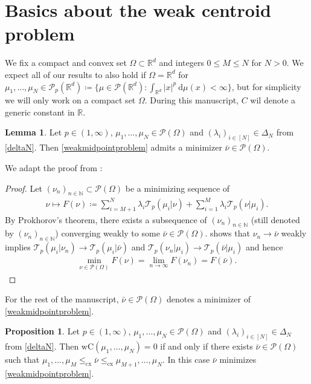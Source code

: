 \documentclass[letterpaper]{amsart}
\newcommand{\RR}{\mathbb{R}}
\newcommand{\NN}{\mathbb{N}}
\newcommand{\dd}{\mathrm{d}}
\theoremstyle{definition}
\newtheorem{lma}[thm]{Lemma}
\newtheorem{prop}[thm]{Proposition}
\begin{document}
\section{Basics about the weak centroid problem}
We fix a compact and convex set $\Omega\subset\RR^d$ and integers $0\leq M\leq N$ for $N>0$. We expect all of our results to also hold if $\Omega=\RR^d$ for $\mu_1,\dots,\mu_N\in\mathcal P_p(\RR^d)\coloneqq\big\{\mu\in\mathcal P(\RR^d):\int_{\RR^d}|x|^p\ \dd\mu(x)<\infty\}$, but for simplicity we will only work on a compact set $\Omega$. During this manuscript, $C$ wil denote a generic constant in $\RR$.
\begin{lma}
	Let $p\in (1,\infty)$,  $\mu_1,\dots,\mu_N\in\mathcal P(\Omega)$ and $(\lambda_i)_{i\in[N]}\in\Delta_N$ from \eqref{deltaN}. Then \eqref{weakmidpointproblem} admits a minimizer $\bar\nu\in\mathcal P(\Omega)$.
\end{lma}
We adapt the proof from \cite[Prop 1]{cazelles2021}:
\begin{proof}
	Let $(\nu_n)_{n\in\NN}\subset\mathcal P(\Omega)$ be a minimizing sequence of 
	\begin{gather*}
		\nu\mapsto F(\nu)\coloneqq \sum_{i=M+1}^N\mathcal \lambda_i \mathcal T_p(\mu_i|\nu)+\sum_{i=1}^M\lambda_i\mathcal T_p(\nu|\mu_i).
	\end{gather*}
	By Prokhorov's theorem, there exists a subsequence of $(\nu_n)_{n\in\NN}$ (still denoted by $(\nu_n)_{n\in\NN}$) converging weakly to some $\bar\nu\in\mathcal P(\Omega)$. \cite[Thm 1.5]{backhoff2020} shows that $\nu_n\rightarrow\bar\nu$ weakly implies $\mathcal T_p(\mu_i|\nu_n)\rightarrow\mathcal T_p(\mu_i|\bar\nu)$ and $\mathcal T_p(\nu_n|\mu_i)\rightarrow\mathcal T_p(\bar\nu|\mu_i)$ and hence
	\begin{gather*}
		\min_{\nu\in\mathcal P(\Omega)}F(\nu)=\lim_{n\rightarrow\infty}F(\nu_n)=F(\bar\nu).
	\end{gather*}
\end{proof}
For the rest of the manuscript, $\bar\nu\in\mathcal P(\Omega)$ denotes a minimizer of \eqref{weakmidpointproblem}.
\begin{prop}\label{zeroclassprop}
	Let $p\in(1,\infty)$, $\mu_1,\dots,\mu_N\in\mathcal P(\Omega)$ and 
	$(\lambda_i)_{i\in[N]}\in\Delta_N$ from \eqref{deltaN}. Then $\text{wC}(\mu_1,\dots,\mu_N)=0$ if and only if there exists $\bar\nu\in\mathcal P(\Omega)$ such that $\mu_1,\dots,\mu_M\leq_{\text{cx}}\bar\nu\leq_{\text{cx}}\mu_{M+1},\dots,\mu_{N}$. In this case $\bar\nu$ minimizes \eqref{weakmidpointproblem}.
\end{prop}
\end{document}
